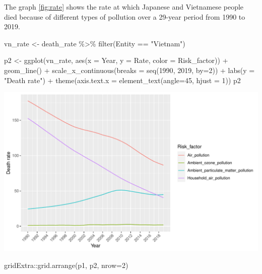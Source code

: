 \documentclass[11pt,a4paper,]{article}
\newenvironment{Shaded}{\begin{snugshade}}{\end{snugshade}}
\newcommand{\AttributeTok}[1]{\textcolor[rgb]{0.77,0.63,0.00}{#1}}
\newcommand{\DecValTok}[1]{\textcolor[rgb]{0.00,0.00,0.81}{#1}}
\newcommand{\FunctionTok}[1]{\textcolor[rgb]{0.00,0.00,0.00}{#1}}
\newcommand{\NormalTok}[1]{#1}
\newcommand{\OtherTok}[1]{\textcolor[rgb]{0.56,0.35,0.01}{#1}}
\newcommand{\SpecialCharTok}[1]{\textcolor[rgb]{0.00,0.00,0.00}{#1}}
\newcommand{\StringTok}[1]{\textcolor[rgb]{0.31,0.60,0.02}{#1}}
\begin{document}
The graph \ref{fig:rate} shows the rate at which Japanese and Vietnamese people died because of different types of pollution over a 29-year period from 1990 to 2019.

\begin{Shaded}
\begin{Highlighting}[]
\NormalTok{vn\_rate }\OtherTok{\textless{}{-}}\NormalTok{ death\_rate }\SpecialCharTok{\%\textgreater{}\%}
  \FunctionTok{filter}\NormalTok{(Entity }\SpecialCharTok{==} \StringTok{"Vietnam"}\NormalTok{)}

\NormalTok{p2 }\OtherTok{\textless{}{-}} \FunctionTok{ggplot}\NormalTok{(vn\_rate, }\FunctionTok{aes}\NormalTok{(}\AttributeTok{x =}\NormalTok{ Year, }\AttributeTok{y =}\NormalTok{ Rate, }\AttributeTok{color =}\NormalTok{ Risk\_factor)) }\SpecialCharTok{+}
  \FunctionTok{geom\_line}\NormalTok{() }\SpecialCharTok{+}
  \FunctionTok{scale\_x\_continuous}\NormalTok{(}\AttributeTok{breaks =} \FunctionTok{seq}\NormalTok{(}\DecValTok{1990}\NormalTok{, }\DecValTok{2019}\NormalTok{, }\AttributeTok{by=}\DecValTok{2}\NormalTok{)) }\SpecialCharTok{+}
  \FunctionTok{labs}\NormalTok{(}\AttributeTok{y =} \StringTok{"Death rate"}\NormalTok{) }\SpecialCharTok{+}
  \FunctionTok{theme}\NormalTok{(}\AttributeTok{axis.text.x =} \FunctionTok{element\_text}\NormalTok{(}\AttributeTok{angle=}\DecValTok{45}\NormalTok{, }\AttributeTok{hjust =} \DecValTok{1}\NormalTok{))}
\NormalTok{p2}
\end{Highlighting}
\end{Shaded}

\includegraphics{Assignment4_files/figure-latex/unnamed-chunk-5-1.pdf}

\begin{Shaded}
\begin{Highlighting}[]
\NormalTok{gridExtra}\SpecialCharTok{::}\FunctionTok{grid.arrange}\NormalTok{(p1, p2, }\AttributeTok{nrow=}\DecValTok{2}\NormalTok{)}
\end{Highlighting}
\end{Shaded}
\end{document}
